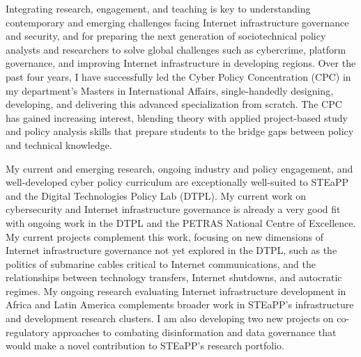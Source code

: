 \documentclass[11pt]{letter}
\begin{document}
\begin{letter}
Integrating research, engagement, and teaching is key to understanding contemporary and emerging challenges facing Internet infrastructure governance and security, and for preparing the next generation of sociotechnical policy analysts and researchers to solve global challenges such as cybercrime, platform governance, and improving Internet infrastructure in developing regions.  
%
Over the past four years, I have successfully led the Cyber Policy Concentration (CPC) in my department's Masters in International Affairs,  single-handedly designing, developing, and delivering this advanced specialization from scratch. 
%
The CPC has gained increasing interest, blending theory with applied project-based study and policy analysis skills that prepare students to the bridge gaps between policy and technical knowledge. 


My current and emerging research, ongoing industry and policy engagement, and well-developed cyber policy curriculum are exceptionally well-suited to STEaPP and the Digital Technologies Policy Lab (DTPL).
%
My current work on cybersecurity and Internet infrastructure governance is already a very good fit with ongoing work in the DTPL and the PETRAS National Centre of Excellence. 
%
My current projects complement this work, focusing on new dimensions of Internet infrastructure governance not yet explored in the DTPL, such as the politics of submarine cables critical to Internet communications, and the relationships between technology transfers, Internet shutdowns, and autocratic regimes. 
%
My ongoing research evaluating Internet infrastructure development in Africa and Latin America complements broader work in STEaPP’s infrastructure and development research clusters.
%
I am also developing two new projects on co-regulatory approaches to combating disinformation and data governance that would make a novel contribution to STEaPP’s research portfolio. 


\end{letter}
\end{document}
